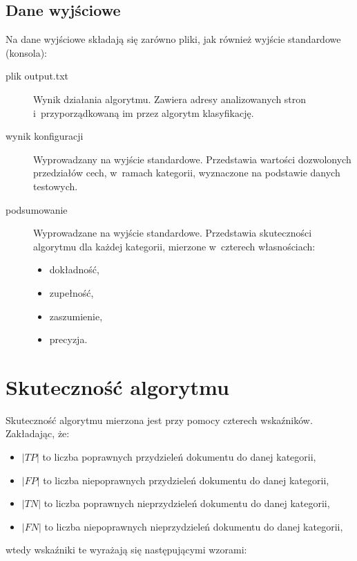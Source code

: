 \documentclass[a4paper,11pt]{article}
\begin{document}
\subsection{Dane wyjściowe}

Na dane wyjściowe składają się zarówno pliki, jak również wyjście standardowe (konsola):

\begin{description}
    \item[plik output.txt] Wynik działania algorytmu. Zawiera adresy analizowanych stron i~przyporządkowaną im przez algorytm klasyfikację.
    \item[wynik konfiguracji] Wyprowadzany na wyjście standardowe. Przedstawia wartości dozwolonych przedziałów cech, w~ramach kategorii, wyznaczone na podstawie danych testowych.
    \item[podsumowanie] Wyprowadzane na wyjście standardowe. Przedstawia skuteczności algorytmu dla każdej kategorii, mierzone w~czterech własnościach:
        \begin{itemize}
            \item dokładność,
            \item zupełność,
            \item zaszumienie,
            \item precyzja.
        \end{itemize}
\end{description}

\section{Skuteczność algorytmu}

Skuteczność algorytmu mierzona jest przy pomocy czterech wskaźników. Zakładając, że:
 
\begin{itemize}
 \item $|TP|$ to liczba poprawnych przydzieleń dokumentu do danej kategorii, 
 \item $|FP|$ to liczba niepoprawnych przydzieleń dokumentu do danej kategorii,
 \item $|TN|$ to liczba poprawnych nieprzydzieleń dokumentu do danej kategorii,
 \item $|FN|$ to liczba niepoprawnych nieprzydzieleń dokumentu do danej kategorii,
\end{itemize}

wtedy wskaźniki te wyrażają się następującymi wzorami:
\end{document}
